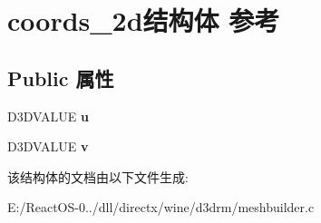 \hypertarget{structcoords__2d}{}\section{coords\+\_\+2d结构体 参考}
\label{structcoords__2d}
\subsection*{Public 属性}
\begin{DoxyCompactItemize}
\item 
\mbox{\label{structcoords__2d_abd36ea828c8128265754338f1bd7f381}} 
D3\+D\+V\+A\+L\+UE {\bfseries u}
\item 
\mbox{\label{structcoords__2d_a3d34a9474d395f3f858f3f1b930a0de6}} 
D3\+D\+V\+A\+L\+UE {\bfseries v}
\end{DoxyCompactItemize}


该结构体的文档由以下文件生成\+:\begin{DoxyCompactItemize}
\item 
E\+:/\+React\+O\+S-\/0../dll/directx/wine/d3drm/meshbuilder.\+c\end{DoxyCompactItemize}
